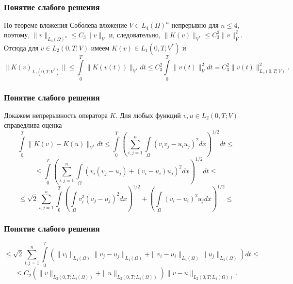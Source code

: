 \documentclass[10pt, pdf, hyperref={unicode}]{beamer}
\begin{document}
  \begin{frame}
    \frametitle{Понятие слабого решения}
    \begin{center}
      \begin{minipage}[h]{0.97\linewidth}
      По теореме вложения Соболева вложение $V\in L_4(\Omega)^n$ непрерывно для $n\le 4$, поэтому, $\|v\|_{L_4(\Omega)^n}\le C_3\|v\|_V$ и, следовательно,
        $\|K(v)\|_{V^*}\le C_3^2\|v\|^2_V.$ Отсюда для $v\in L_2(0,T;V)$ имеем $K(v)\in L_1(0,T;V^*)$ и 
        $$\|K(v)_{L_1(0,T;V^*)}\|\le\int\limits_0^T\|K(v(t))\|_{V^*} dt\le C_3^2\int\limits_0^T\|v(t)\|_V^2 dt=C_3^2\|v(t)\|_{L_2(0,T;V)}^2.$$
      \end{minipage}
    \end{center}
  \end{frame}

  \begin{frame}
    \frametitle{Понятие слабого решения}
    \begin{center}
      \begin{minipage}[h]{0.97\linewidth}
        Докажем непрерывность оператора $K$. Для любых функций\linebreak
        $v,u\in L_2(0,T;V)$ справедлива оценка
        $$\int\limits_0^T\|K(v)-K(u)\|_{V^*} dt\le\int\limits_0^T(\sum_{i,j=1}^{n}\int\limits_\Omega (v_iv_j-u_iu_j)^2dx)^{1/2} dt\le$$
        $$\le\int\limits_0^T(\sum_{i,j=1}^{n}\int\limits_\Omega (v_i(v_j-u_j)+(v_i-u_i)u_j)^2dx)^{1/2}dt\le$$
        $$\le\sqrt2\sum_{i,j=1}^{n}\int\limits_0^T (\int\limits_{\Omega}v^2_i(v_j-u_j)^2dx)^{1/2}+
        (\int\limits_{\Omega}(v_i-u_i)^2u_j dx)^{1/2}\le$$
      \end{minipage}
    \end{center}
  \end{frame}


  \begin{frame}
    \frametitle{Понятие слабого решения}
    \begin{center}
      \begin{minipage}[h]{0.97\linewidth}
        $$\le\sqrt2\sum_{i,j=1}^{n}\int\limits_0^T(\|v_i\|_{L_4(\Omega)}\|v_j-u_j\|_{L_4(\Omega)}
        +\|v_i-u_i\|_{L_4(\Omega)}\|u_j\|_{L_4(\Omega)})dt\le$$
        $$\le C_2(\|v\|_{L_2(0,T;L_4(\Omega))}+\|u\|_{L_2(0,T;L_4(\Omega))})\|v-u\|_{L_2(0,T;L_4(\Omega))}.$$
      \end{minipage}
    \end{center}
  \end{frame}
\end{document}
